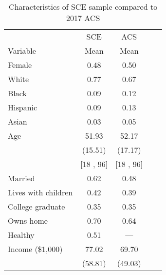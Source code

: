 \begin{table}[ht]
\caption{Characteristics of SCE sample compared to 2017 ACS}
\label{tab:descT1}
\centering
\begin{footnotesize}
\begin{threeparttable}
\begin{tabular}{lcccc}
\toprule 
         & SCE  & ACS  \\
Variable & Mean & Mean \\
\midrule 
Female                                    & 0.48                        & 0.50                            \\ 
White                                     & 0.77                        & 0.67                            \\ 
Black                                     & 0.09                        & 0.12                            \\ 
Hispanic                                  & 0.09                        & 0.13                            \\ 
Asian                                     & 0.03                        & 0.05                            \\ 
Age                                       & 51.93                        & 52.17                            \\ 
                                          &(15.51)                       &(17.17)                           \\ 
                                          &[18 , 96]&[18 , 96]\\ 
Married                                   & 0.62                        & 0.48                            \\ 
Lives with children                       & 0.42                        & 0.39                            \\ 
College graduate                          & 0.35                        & 0.35                            \\ 
Owns home                                 & 0.70                        & 0.64                            \\ 
Healthy                                   & 0.51                        & ---                                                   \\ 
Income (\$1,000)                         & 77.02                        & 69.70                            \\ 
                                          &(58.81)                       &(49.03)                           \\ 

\end{tabular}
\end{threeparttable}
\end{footnotesize}
\end{table}
